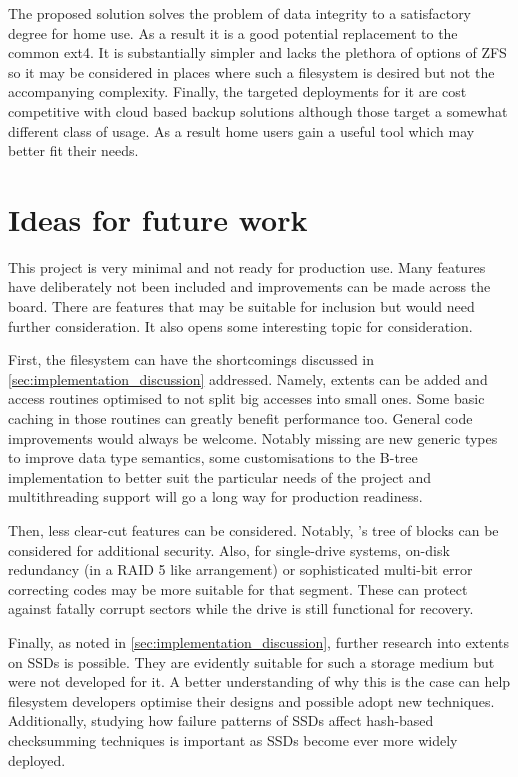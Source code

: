         The proposed solution solves the problem of data integrity to a
        satisfactory degree for home use. As a result it is a good potential
        replacement to the common ext4. It is substantially simpler and lacks
        the plethora of options of ZFS so it may be considered in places where
        such a filesystem is desired but not the accompanying complexity.
        Finally, the targeted deployments for it are cost competitive with
        cloud based backup solutions although those target a somewhat different
        class of usage. As a result home users gain a useful tool which may
        better fit their needs.

    \section{Ideas for future work}

        This project is very minimal and not ready for production use. Many
        features have deliberately not been included and improvements can be
        made across the board. There are features that may be suitable for
        inclusion but would need further consideration. It also opens some
        interesting topic for consideration.

        First, the filesystem can have the shortcomings discussed in
        \autoref{sec:implementation_discussion} addressed. Namely, extents can be
        added and access routines optimised to not split big accesses into
        small ones. Some basic caching in those routines can greatly benefit
        performance too. General code improvements would always be
        welcome. Notably missing are new generic types to improve data type
        semantics, some customisations to the B-tree implementation to better
        suit the particular needs of the project and multithreading support will
        go a long way for production readiness.

        Then, less clear-cut features can be considered. Notably,
        's tree of blocks can be considered for additional
        security. Also, for single-drive systems, on-disk redundancy (in a RAID
        5 like arrangement) or sophisticated multi-bit error correcting codes
        may be more suitable for that segment. These can protect against
        fatally corrupt sectors while the drive is still functional for
        recovery.

        Finally, as noted in \autoref{sec:implementation_discussion}, further
        research into extents on SSDs is possible. They are evidently suitable
        for such a storage medium but were not developed for it. A better
        understanding of why this is the case can help filesystem developers
        optimise their designs and possible adopt new techniques. Additionally,
        studying how failure patterns of SSDs affect hash-based checksumming
        techniques is important as SSDs become ever more widely deployed.

